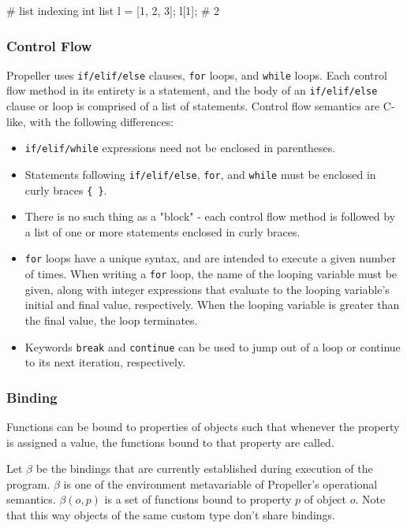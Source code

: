 \begin{mylisting}
# list indexing
int list l = [1, 2, 3];
l[1];           # 2
\end{mylisting}

\subsubsection{Control Flow}
Propeller uses \texttt{if/elif/else} clauses, \texttt{for} loops, and \texttt{while} loops.
Each control flow method in its entirety is a statement, and the body of an
\texttt{if/elif/else} clause or loop is comprised of a list of statements. Control flow
semantics are C-like, with the following differences:
\begin{itemize}
    \item \texttt{if/elif/while} expressions need not be enclosed in parentheses.
    \item Statements following \texttt{if/elif/else}, \texttt{for}, and \texttt{while} must
          be enclosed in curly braces \texttt{\{ \}}.
    \item There is no such thing as a "block" - each control flow method is followed by a list
          of one or more statements enclosed in curly braces.
    \item \texttt{for} loops have a unique syntax, and are intended to execute a given number of
          times. When writing a \texttt{for} loop, the name of the looping variable must be given, along
          with integer expressions that evaluate to the looping variable's initial and final
          value, respectively. When the looping variable is greater than the final value, the
          loop terminates.
   \item Keywords \texttt{break} and \texttt{continue} can be used to jump out of a loop or continue
         to its next iteration, respectively.
\end{itemize}

\subsubsection{Binding}

Functions can be bound to properties of objects such that whenever the property is assigned a value,
the functions bound to that property are called.

Let $\beta$ be the bindings that are currently established during execution of the program. $\beta$
is one of the environment metavariable of Propeller's operational semantics.
$\beta(o, p)$ is a set of functions bound to property $p$ of object $o$. Note that this way objects
of the same custom type don't share bindings.

